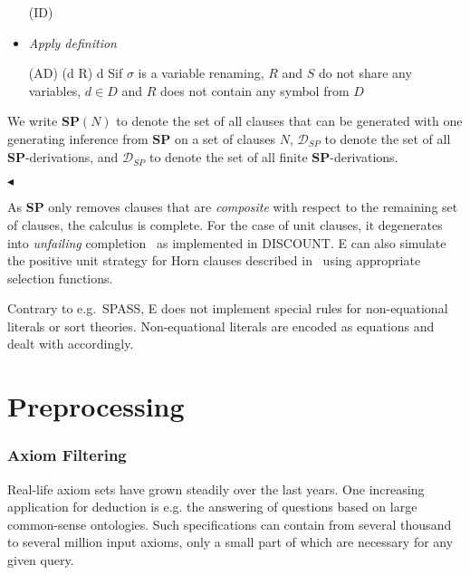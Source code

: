 \documentclass{report}
\begin{document}
\begin{definition}
\begin{itemize}
   \bigskip (ID) 

 \item \emph{Apply definition}

   \bigskip (AD) 
   {\sigma(d \vee R) \phantom{ae} \neg d \vee S}{if $\sigma$ is a
     variable renaming, $R$ and $S$ do not share
     any variables, $d \in D$ and $R$ does not contain any symbol from
     $D$}


 \end{itemize}
 We write $\mathbf{SP}(N)$ to denote the set of all clauses that can
 be generated with one generating inference from $\mathbf{SP}$ on a
 set of clauses $N$, $\mathcal{D}_{SP}$ to denote the set of all
 \textbf{SP}-derivations, and $\mathcal{D}_{\overline{SP}}$ to denote
 the set of all finite \textbf{SP}-derivations.

  \hfill$\blacktriangleleft$
\end{definition}



As \textbf{SP} only removes clauses that are \emph{composite} with
respect to the remaining set of clauses, the calculus is complete. For
the case of unit clauses, it degenerates into \emph{unfailing}
completion~\cite{BDP89} as implemented in DISCOUNT. E
can also simulate the positive unit strategy for Horn clauses
described in~\cite{Dershowitz:IJCAI-91} using appropriate selection
functions.

Contrary to e.g.\ SPASS, E does not implement special
rules for non-equa\-tio\-nal literals or sort theories. Non-equational
literals are encoded as equations and dealt with accordingly.


\section{Preprocessing}

\subsubsection{Axiom Filtering}
\label{:secsine}

Real-life axiom sets have grown steadily over the last years. One
increasing application for deduction is e.g. the answering of questions
based on large common-sense ontologies. Such specifications can
contain from several thousand to several million input axioms, only a
small part of which are necessary for any given query.
\end{document}
